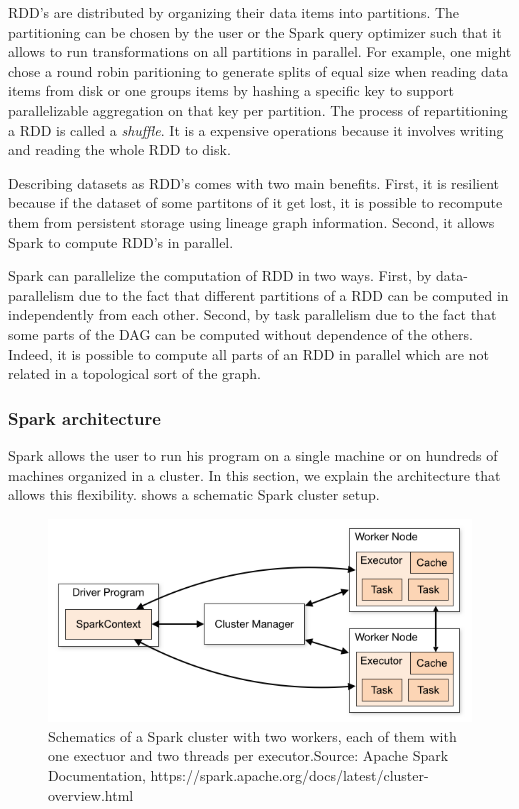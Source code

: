 RDD's are distributed by organizing their data items into partitions.
The partitioning can be chosen by the user or the Spark query optimizer such that it allows to run transformations on all partitions
in parallel.
For example, one might chose a round robin paritioning to generate splits of equal size when reading data items from disk or one
groups items by hashing a specific key to support parallelizable aggregation on that key per partition.
The process of repartitioning a RDD is called a \textit{shuffle}.
It is a expensive operations because it involves writing and reading the whole RDD to disk.

Describing datasets as RDD's comes with two main benefits.
First, it is resilient because if the dataset of some partitons of it get lost, it is possible to recompute them from persistent storage
using lineage graph information.
Second, it allows Spark to compute RDD's in parallel.

Spark can parallelize the computation of RDD in two ways.
First, by data-parallelism due to the fact that different partitions of a RDD can
be computed in independently from each other.
Second, by task parallelism due to the fact that some parts of the DAG can be computed without dependence of the others.
Indeed, it is possible to compute all parts of an RDD in parallel which are not related in a topological sort of the graph.

\subsubsection{Spark architecture} \label{subsubsec:spark-architecture}
Spark allows the user to run his program on a single machine or on hundreds of machines organized in a cluster.
In this section, we explain the architecture that allows this flexibility.
 shows a schematic Spark cluster setup.

\begin{figure}
    \includegraphics[width=\textwidth]{figures/spark-cluster.png}
    \caption{Schematics of a Spark cluster with two workers, each of them with one exectuor and two threads per executor.Source: Apache Spark Documentation, https://spark.apache.org/docs/latest/cluster-overview.html}
\end{figure}

